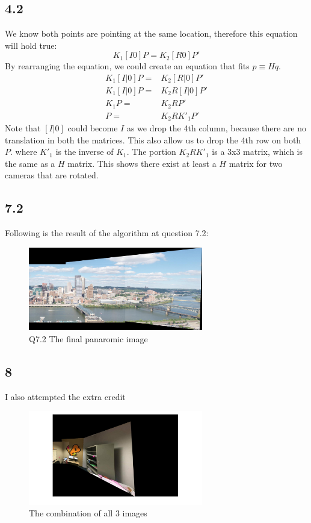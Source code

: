 \documentclass{article}
\begin{document}
\subsection*{4.2}
We know both points are pointing at the same location, therefore this equation will hold true:
\begin{equation*}
K_1[I 0]P = K_2[R 0]P'
\end{equation*}
By rearranging the equation, we could create an equation that fits $p \equiv H q$.
\begin{equation*}
\begin{aligned}
K_1[I|0]P =& K_2[R|0]P'\\
K_1[I|0]P =& K_2R[I|0]P'\\
K_1P =& K_2RP'\\
P =& K_2RK'_1P'
\end{aligned}
\end{equation*}
Note that $[I|0]$ could become $I$ as we drop the 4th column, because there are no translation in both the matrices. This also allow us to drop the 4th row on both $P$. 
where $K'_1$ is the inverse of $K_1$. The portion $K_2RK'_1$ is a 3x3 matrix, which is the same as a $H$ matrix. This shows there exist at least a $H$ matrix for two cameras that are rotated.

\subsection*{7.2}
Following is the result of the algorithm at question 7.2:
\begin{figure}[h]
    \centering
    \includegraphics[width=3.0in]{./results/q7_2_pan}
    \caption{Q7.2 The final panaromic image}
\end{figure}
\subsection*{8}
I also attempted the extra credit
\begin{figure}[h]
    \centering
    \includegraphics[width=3.0in]{./results/ec8_pan}
    \caption{The combination of all 3 images}
\end{figure}
\end{document}

